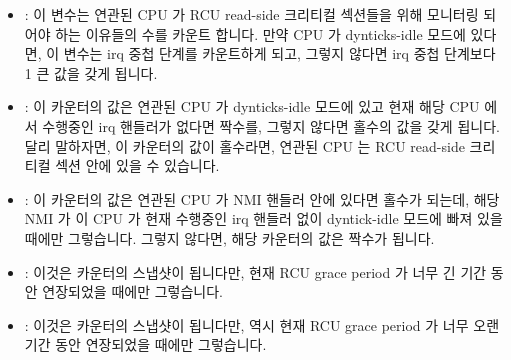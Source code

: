 \begin{itemize}
\item	{}:
	이 변수는 연관된 CPU 가 RCU read-side 크리티컬 섹션들을 위해 모니터링
	되어야 하는 이유들의 수를 카운트 합니다.
	만약 CPU 가 dynticks-idle 모드에 있다면, 이 변수는 irq 중첩 단계를
	카운트하게 되고, 그렇지 않다면 irq 중첩 단계보다 1 큰 값을 갖게 됩니다.
\item	{}:
	이 카운터의 값은 연관된 CPU 가 dynticks-idle 모드에 있고 현재 해당 CPU
	에서 수행중인 irq 핸들러가 없다면 짝수를, 그렇지 않다면 홀수의 값을
	갖게 됩니다.
	달리 말하자면, 이 카운터의 값이 홀수라면, 연관된 CPU 는 RCU read-side
	크리티컬 섹션 안에 있을 수 있습니다.
\iffalse

\item	\co{dynticks_nesting}:
	This counts the number of reasons that the corresponding
	CPU should be monitored for RCU read-side critical sections.
	If the CPU is in dynticks-idle mode, then this counts the
	irq nesting level, otherwise it is one greater than the
	irq nesting level.
\item	\co{dynticks}:
	This counter's value is even if the corresponding CPU is
	in dynticks-idle mode and there are no irq handlers currently
	running on that CPU, otherwise the counter's value is odd.
	In other words, if this counter's value is odd, then the
	corresponding CPU might be in an RCU read-side critical section.
\fi
\item	{}:
	이 카운터의 값은 연관된 CPU 가 NMI 핸들러 안에 있다면 홀수가 되는데,
	해당 NMI 가 이 CPU 가 현재 수행중인 irq 핸들러 없이 dyntick-idle 모드에
	빠져 있을 때에만 그렇습니다.
	그렇지 않다면, 해당 카운터의 값은 짝수가 됩니다.
\item	{}:
	이것은  카운터의 스냅샷이 됩니다만, 현재 RCU grace period
	가 너무 긴 기간 동안 연장되었을 때에만 그렇습니다.
\item	{}:
	이것은  카운터의 스냅샷이 됩니다만, 역시 현재 RCU
	grace period 가 너무 오랜 기간 동안 연장되었을 때에만 그렇습니다.
\iffalse

\item	\co{dynticks_nmi}:
	This counter's value is odd if the corresponding CPU is
	in an NMI handler, but only if the NMI arrived while this
	CPU was in dyntick-idle mode with no irq handlers running.
	Otherwise, the counter's value will be even.
\item	\co{dynticks_snap}:
	This will be a snapshot of the \co{dynticks} counter, but
	only if the current RCU grace period has extended for too
	long a duration.
\item	\co{dynticks_nmi_snap}:
	This will be a snapshot of the \co{dynticks_nmi} counter, but
	again only if the current RCU grace period has extended for too
	long a duration.
\fi
\end{itemize}


